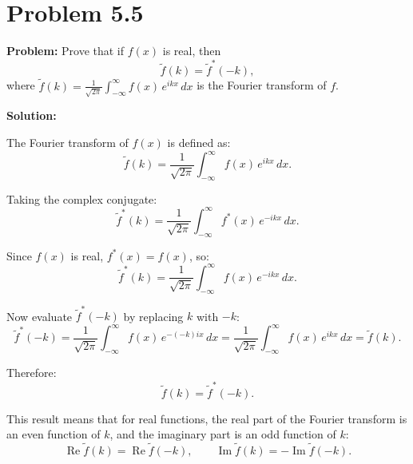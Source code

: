 \documentclass[12pt]{article}
\begin{document}
\section*{Problem 5.5}

\textbf{Problem:} Prove that if $f(x)$ is real, then
\[
\tilde{f}(k) = \tilde{f}^*(-k),
\]
where $\tilde{f}(k) = \frac{1}{\sqrt{2\pi}}\int_{-\infty}^{\infty} f(x)\,e^{ikx}\,dx$ is the Fourier transform of $f$.

\bigskip
\textbf{Solution:}

The Fourier transform of $f(x)$ is defined as:
\[
\tilde{f}(k) = \frac{1}{\sqrt{2\pi}}\int_{-\infty}^{\infty} f(x)\,e^{ikx}\,dx.
\]

Taking the complex conjugate:
\[
\tilde{f}^*(k) = \frac{1}{\sqrt{2\pi}}\int_{-\infty}^{\infty} f^*(x)\,e^{-ikx}\,dx.
\]

Since $f(x)$ is real, $f^*(x) = f(x)$, so:
\[
\tilde{f}^*(k) = \frac{1}{\sqrt{2\pi}}\int_{-\infty}^{\infty} f(x)\,e^{-ikx}\,dx.
\]

Now evaluate $\tilde{f}^*(-k)$ by replacing $k$ with $-k$:
\[
\tilde{f}^*(-k) = \frac{1}{\sqrt{2\pi}}\int_{-\infty}^{\infty} f(x)\,e^{-(-k)ix}\,dx = \frac{1}{\sqrt{2\pi}}\int_{-\infty}^{\infty} f(x)\,e^{ikx}\,dx = \tilde{f}(k).
\]

Therefore:
\[
\boxed{\tilde{f}(k) = \tilde{f}^*(-k).}
\]

This result means that for real functions, the real part of the Fourier transform is an even function of $k$, and the imaginary part is an odd function of $k$:
\[
\operatorname{Re}\tilde{f}(k) = \operatorname{Re}\tilde{f}(-k), \qquad \operatorname{Im}\tilde{f}(k) = -\operatorname{Im}\tilde{f}(-k).
\]
\end{document}
